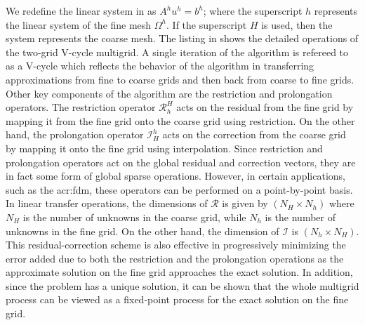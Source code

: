 We redefine the linear system in  as $A^h u^h = b^h$; where the superscript $h$ represents the linear system of the fine mesh $\Omega^h$. 
If the superscript $H$ is used, then the system represents the coarse mesh.
The listing in  shows the detailed operations of the two-grid V-cycle multigrid.
A single iteration of the algorithm is refereed to as a V-cycle which reflects the behavior of the algorithm in transferring approximations from fine to coarse grids and then back from coarse to fine grids.
Other key components of the algorithm are the restriction and prolongation operators.
The restriction operator $\mathcal{R}_{h}^{H}$ acts on the residual from the fine grid by mapping it from the fine grid onto the coarse grid using restriction.
On the other hand, the prolongation operator $\mathcal{I}_{H}^h$ acts on the correction from the coarse grid by mapping it onto the fine grid using interpolation.
Since restriction and prolongation operators act on the global residual and correction vectors, they are in fact some form of global sparse operations.
However, in certain applications, such as the \gls{acr:fdm}, these operators can be performed on a point-by-point basis.
In linear transfer operations, the dimensions of $\mathcal{R}$ is given by $(N_H\times N_h)$ where $N_H$ is the number of unknowns in the coarse grid, while $N_h$ is the number of unknowns in the fine grid.
On the other hand, the dimension of $\mathcal{I}$ is $(N_h\times N_H)$.
This residual-correction scheme is also effective in progressively minimizing the error added due to both the restriction and the prolongation operations as the approximate solution on the fine grid approaches the exact solution.
In addition, since the problem has a unique solution, it can be shown that the whole multigrid process can be viewed as a fixed-point process for the exact solution on the fine grid.

